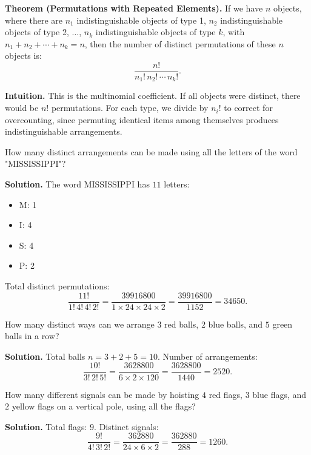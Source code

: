 \documentclass[11pt,a4paper]{article}
\begin{document}
\textbf{Theorem (Permutations with Repeated Elements).} If we have $n$ objects, where there are $n_1$ indistinguishable objects of type 1, $n_2$ indistinguishable objects of type 2, $\dots$, $n_k$ indistinguishable objects of type $k$, with $n_1 + n_2 + \cdots + n_k = n$, then the number of distinct permutations of these $n$ objects is:
\begin{equation*}
    \frac{n!}{n_1! \, n_2! \, \cdots \, n_k!}.
\end{equation*}

\textbf{Intuition.} This is the multinomial coefficient. If all objects were distinct, there would be $n!$ permutations. For each type, we divide by $n_i!$ to correct for overcounting, since permuting identical items among themselves produces indistinguishable arrangements.

\begin{example}
How many distinct arrangements can be made using all the letters of the word "MISSISSIPPI"?

\textbf{Solution.} The word MISSISSIPPI has $11$ letters:
\begin{itemize}[label=--]
    \item M: 1
    \item I: 4
    \item S: 4
    \item P: 2
\end{itemize}
Total distinct permutations:
\begin{equation*}
    \frac{11!}{1! \, 4! \, 4! \, 2!} = \frac{39916800}{1 \times 24 \times 24 \times 2} = \frac{39916800}{1152} = 34650.
\end{equation*}
\end{example}

\begin{example}
How many distinct ways can we arrange $3$ red balls, $2$ blue balls, and $5$ green balls in a row?

\textbf{Solution.} Total balls $n = 3 + 2 + 5 = 10$. Number of arrangements:
\begin{equation*}
    \frac{10!}{3! \, 2! \, 5!} = \frac{3628800}{6 \times 2 \times 120} = \frac{3628800}{1440} = 2520.
\end{equation*}
\end{example}

\begin{example}
How many different signals can be made by hoisting $4$ red flags, $3$ blue flags, and $2$ yellow flags on a vertical pole, using all the flags?

\textbf{Solution.} Total flags: $9$. Distinct signals:
\begin{equation*}
    \frac{9!}{4! \, 3! \, 2!} = \frac{362880}{24 \times 6 \times 2} = \frac{362880}{288} = 1260.
\end{equation*}
\end{example}
\end{document}
